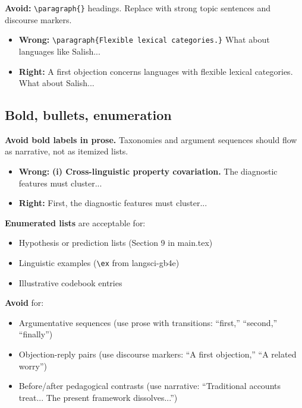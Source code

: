 \documentclass[12pt]{article}
\begin{document}
\textbf{Avoid:} \verb|\paragraph{}| headings. Replace with strong topic sentences and discourse markers.

\begin{itemize}[nosep]
  \item \textbf{Wrong:} \verb|\paragraph{Flexible lexical categories.}| What about languages like Salish...
  \item \textbf{Right:} A first objection concerns languages with flexible lexical categories. What about Salish...
\end{itemize}

\subsection{Bold, bullets, enumeration}
\textbf{Avoid bold labels in prose.} Taxonomies and argument sequences should flow as narrative, not as itemized lists.

\begin{itemize}[nosep]
  \item \textbf{Wrong:} \textbf{(i) Cross-linguistic property covariation.} The diagnostic features must cluster...
  \item \textbf{Right:} First, the diagnostic features must cluster...
\end{itemize}

\textbf{Enumerated lists} are acceptable for:
\begin{itemize}[nosep]
  \item Hypothesis or prediction lists (Section 9 in main.tex)
  \item Linguistic examples (\verb|\ex| from langsci-gb4e)
  \item Illustrative codebook entries
\end{itemize}

\textbf{Avoid} for:
\begin{itemize}[nosep]
  \item Argumentative sequences (use prose with transitions: ``first,'' ``second,'' ``finally'')
  \item Objection-reply pairs (use discourse markers: ``A first objection,'' ``A related worry'')
  \item Before/after pedagogical contrasts (use narrative: ``Traditional accounts treat... The present framework dissolves...'')
\end{itemize}
\end{document}
